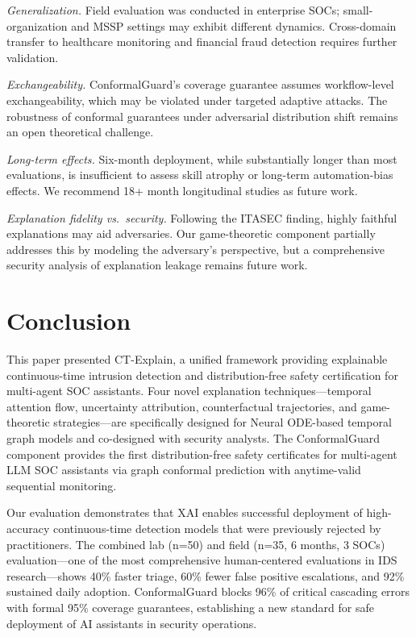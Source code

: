 \documentclass[preprint,review,12pt]{elsarticle}
\begin{document}
\textit{Generalization.} Field evaluation was conducted in enterprise SOCs; small-organization and MSSP settings may exhibit different dynamics. Cross-domain transfer to healthcare monitoring and financial fraud detection requires further validation.

\textit{Exchangeability.} ConformalGuard's coverage guarantee assumes workflow-level exchangeability, which may be violated under targeted adaptive attacks. The robustness of conformal guarantees under adversarial distribution shift remains an open theoretical challenge.

\textit{Long-term effects.} Six-month deployment, while substantially longer than most evaluations, is insufficient to assess skill atrophy or long-term automation-bias effects. We recommend 18+ month longitudinal studies as future work.

\textit{Explanation fidelity vs.\ security.} Following the ITASEC finding, highly faithful explanations may aid adversaries. Our game-theoretic component partially addresses this by modeling the adversary's perspective, but a comprehensive security analysis of explanation leakage remains future work.


\section{Conclusion}
\label{sec:conclusion}

This paper presented CT-Explain, a unified framework providing explainable continuous-time intrusion detection and distribution-free safety certification for multi-agent SOC assistants. Four novel explanation techniques---temporal attention flow, uncertainty attribution, counterfactual trajectories, and game-theoretic strategies---are specifically designed for Neural ODE-based temporal graph models and co-designed with security analysts. The ConformalGuard component provides the first distribution-free safety certificates for multi-agent LLM SOC assistants via graph conformal prediction with anytime-valid sequential monitoring.

Our evaluation demonstrates that XAI enables successful deployment of high-accuracy continuous-time detection models that were previously rejected by practitioners. The combined lab (n=50) and field (n=35, 6 months, 3 SOCs) evaluation---one of the most comprehensive human-centered evaluations in IDS research---shows 40\% faster triage, 60\% fewer false positive escalations, and 92\% sustained daily adoption. ConformalGuard blocks 96\% of critical cascading errors with formal 95\% coverage guarantees, establishing a new standard for safe deployment of AI assistants in security operations.
\end{document}
